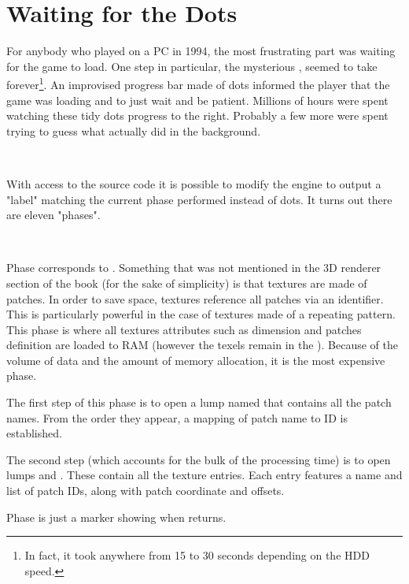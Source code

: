\section{Waiting for the Dots}
\label{dots_explained}
For anybody who played \doom{} on a PC in 1994, the most frustrating part was waiting for the game to load. One step in particular, the mysterious , seemed to take forever\footnote{In fact, it took anywhere from 15 to 30 seconds depending on the HDD speed.}. An improvised progress bar made of dots informed the player that the game was loading and to just wait and be patient. Millions of hours were spent watching these tidy dots progress to the right. Probably a few more were spent trying to guess what  actually did in the background.\\
\par
{}\\
\par
With access to the source code it is possible to modify the engine to output a "label" matching the current phase performed instead of dots. It turns out there are eleven "phases".\\
\par
{}\\
\par

Phase  corresponds to . Something that was not mentioned in the 3D renderer section of the book (for the sake of simplicity) is that textures are made of patches. In order to save space, textures reference all patches via an identifier. This is particularly powerful in the case of textures made of a repeating pattern. This phase is where all textures attributes such as dimension and patches definition are loaded to RAM (however the texels remain in the ). Because of the volume of data and the amount of  memory allocation, it is the most expensive phase.\\
\par
The first step of this phase is to open a lump named  that contains all the patch names. From the order they appear, a mapping of patch name to ID is established.\\
\par
The second step (which accounts for the bulk of the processing time) is to open lumps  and . These contain all the texture entries. Each entry features a name and list of patch IDs, along with patch coordinate and offsets.\\
\par
Phase  is just a marker showing when  returns.\\
\par

